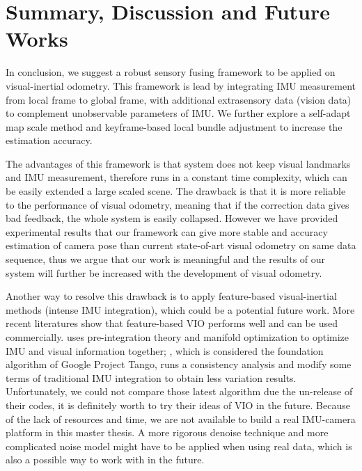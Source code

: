 \chapter{Summary, Discussion and Future Works}
\label{chap:summary}

In conclusion, we suggest a robust sensory fusing framework to be applied on visual-inertial odometry. This framework is lead by integrating IMU measurement from local frame to global frame, with additional extrasensory data (vision data) to complement unobservable parameters of IMU. We further explore a self-adapt map scale method and keyframe-based local bundle adjustment to increase the estimation accuracy.

The advantages of this framework is that system does not keep visual landmarks and IMU measurement, therefore runs in a constant time complexity, which can be easily extended a large scaled scene. The drawback is that it is more reliable to the performance of visual odometry, meaning that if the correction data gives bad feedback, the whole system is easily collapsed. However we have provided experimental results that our framework can give more stable and accuracy estimation of camera pose than current state-of-art visual odometry on same data sequence, thus we argue that our work is meaningful and the results of our system will further be increased with the development of visual odometry.

Another way to resolve this drawback is to apply feature-based visual-inertial methods (intense IMU integration), which could be a potential future work. More recent literatures show that feature-based VIO performs well and can be used commercially. \cite{forster2015imu} uses pre-integration theory and manifold optimization to optimize IMU and visual information together; \cite{hesch2014consistency}, which is considered the foundation algorithm of Google Project Tango, runs a consistency analysis and modify some terms of traditional IMU integration to obtain less variation results. Unfortunately, we could not compare those latest algorithm due the un-release of their codes, it is definitely worth to try their ideas of VIO in the future. Because of the lack of resources and time, we are not available to build a real IMU-camera platform in this master thesis. A more rigorous denoise technique and more complicated noise model might have to be applied when using real data, which is also a possible way to work with in the future. 